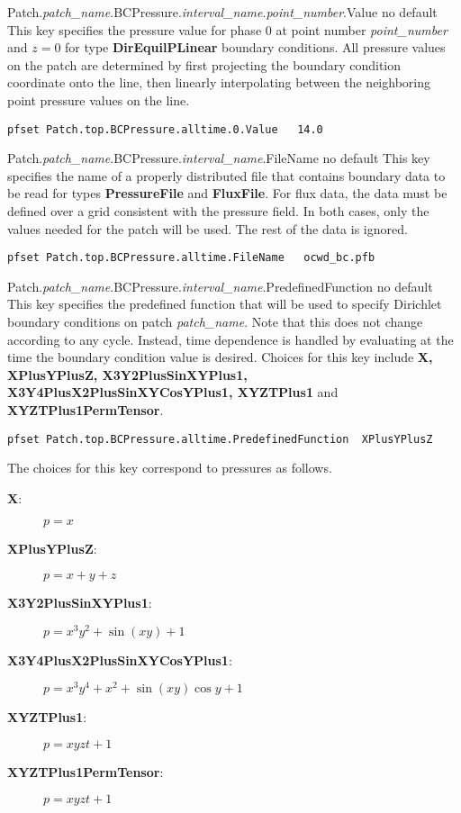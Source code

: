 {Patch.{\em patch\_name}.BCPressure.{\em interval\_name}.{\em point\_number}.Value}
{no default}
{This key specifies the pressure value for phase 0 at point number 
{\em point\_number} and $z=0$ for
type {\bf DirEquilPLinear} boundary conditions.
All pressure values on the patch are determined by first projecting the
boundary condition coordinate onto the line, then linearly interpolating
between the neighboring point pressure values on the line.
}
\begin{display}\begin{verbatim}
pfset Patch.top.BCPressure.alltime.0.Value   14.0
\end{verbatim}\end{display}

{Patch.{\em patch\_name}.BCPressure.{\em interval\_name}.FileName}
{no default}
{This key specifies the name of a properly distributed  file 
that contains boundary data to be read for types {\bf PressureFile} 
and {\bf FluxFile}.  For flux data, the data must be defined over a grid 
consistent with the pressure field.  In both cases, only the values needed 
for the patch will be used.  The rest of the data is ignored.
}
\begin{display}\begin{verbatim}
pfset Patch.top.BCPressure.alltime.FileName   ocwd_bc.pfb
\end{verbatim}\end{display}



{Patch.{\em patch\_name}.BCPressure.{\em interval\_name}.PredefinedFunction}
{no default}
{This key specifies the predefined function that will be used to specify
Dirichlet boundary conditions on patch {\em patch\_name}.
Note that this does not change according to any cycle.
Instead, time dependence is handled by
evaluating at the time the boundary condition value is desired.
Choices for this key include {\bf X, XPlusYPlusZ, X3Y2PlusSinXYPlus1, 
X3Y4PlusX2PlusSinXYCosYPlus1, XYZTPlus1} and {\bf XYZTPlus1PermTensor}.
}
\begin{display}\begin{verbatim}
pfset Patch.top.BCPressure.alltime.PredefinedFunction  XPlusYPlusZ
\end{verbatim}\end{display}
The choices for this key correspond to pressures as follows.
\begin{description}
\item[{\bf X}: ] $p = x$
\item[{\bf XPlusYPlusZ}: ] $p = x + y + z$
\item[{\bf X3Y2PlusSinXYPlus1}: ] $p = x^3 y^2 + \sin(xy) + 1$
\item[{\bf X3Y4PlusX2PlusSinXYCosYPlus1}: ] 
$p = x^3 y^4 + x^2 + \sin(xy)\cos y + 1$
\item[{\bf XYZTPlus1}: ] $p = xyzt + 1$
\item[{\bf XYZTPlus1PermTensor}: ] $p = xyzt + 1$
\end{description}

